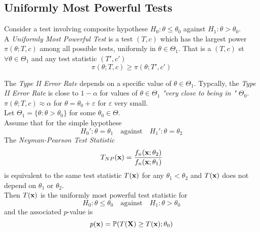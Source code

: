 \documentclass[11pt,a4paper]{article}
\begin{document}
\subsection{Uniformly Most Powerful Tests}

Consider a test involving composite hypothese $H_0:\theta\leq\theta_0$ against $H_1:\theta>\theta_0$.\\
A \textit{Uniformly Most Powerful Test} is a test $(T,c)$ which has the largest power $\pi(\theta;T,c)$ among all possible tests, uniformly in $\theta\in\Theta_1$. That is a $(T,c)$ st $\forall\theta\in\Theta_1$ and any test statistic $(T',c')$
$$\pi(\theta;T,c)\geq\pi(\theta;T',c')$$

\remark{}
The \textit{Type II Error Rate} depends on a specific value of $\theta\in\Theta_1$. Typcally, the \textit{Type II Error Rate} is close to $1-\alpha$ for values of $\theta\in\Theta_1$ \textit{"very close to being in "} $\Theta_0$. \ie $\pi(\theta;T,c)\approx\alpha$ for $\theta=\theta_0+\varepsilon$ for $\varepsilon$ very small.\\

\theorem{}
Let $\Theta_1=\{\theta:\theta>\theta_0\}$ for some $\theta_0\in\Theta$.\\
Assume that for the simple hypothese
$$H_0':\theta=\theta_1\quad\text{against}\quad H_1':\theta=\theta_2$$
The \textit{Neyman-Pearson Test Statistic}
$$T_{NP}(\textbf{x})=\frac{f_n(\textbf{x};\theta_2)}{f_n(\textbf{x};\theta_1)}$$
is equivalent to the same test statistic $T(\textbf{x})$ for any $\theta_1<\theta_2$ and $T(\textbf{x})$ does not depend on $\theta_1$ or $\theta_2$.\\
Then $T(\textbf{x})$ is the uniformly most powerful test statistic for
$$H_0:\theta\leq\theta_0\quad\text{against}\quad H_1:\theta>\theta_0$$
and the associated $p$-value is
$$p(\textbf{x})=\mathbb{P}(T(\textbf{X})\geq T(\textbf{x});\theta_0)$$
\end{document}
